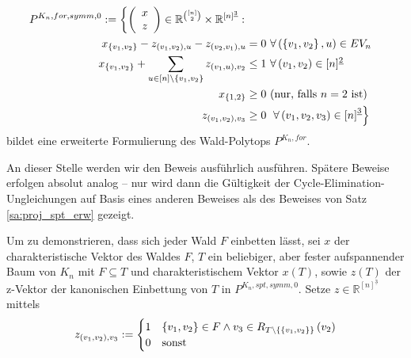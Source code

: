 \documentclass[10p,a4paper,BCOR = 12mm, DIV=15]{scrbook}
\begin{document}
{\begin{Sa}
\label{sa:baum_erweitert_1}
\begin{align}
P^{K_n, for, symm, 0} := \left\{\left(\begin{array}{c}
x \\
z
\end{array}\right)\in\mathbb{R}^{[n]\choose 2}\times \mathbb{R}^{[n]^{\underline{3}}}: \right. \nonumber \\
x_{\left\{v_1, v_2\right\}} - z_{\left(v_1, v_2\right), u} - z_{\left(v_2, v_1\right), u} & = 0\ \forall \left(\left\{v_1, v_2\right\}, u\right)\in EV_n \label{eq:fst_erweitert_2_1} \\
x_{\left\{v_1, v_2\right\}} + \sum_{u\in[n]\backslash\left\{v_1, v_2\right\}} z_{\left(v_1, u\right), v_2} & \leq 1\ \forall \left(v_1, v_2\right)\in [n]^{\underline{2}} \label{eq:fst_erweitert_2_2} \\
x_{\left\{1, 2\right\}} & \geq 0 \textnormal{ (nur, falls $n=2$ ist)} \label{eq:wald_xgeq0} \\
z_{\left(v_1, v_2\right), v_3} & \geq 0 \nonumber \left. \ \forall \left(v_1, v_2, v_3\right) \in \left[n\right]^{\underline{3}}\right\}
\end{align}
bildet eine erweiterte Formulierung des Wald-Polytops $P^{K_n, for}$.
\end{Sa}

\begin{bew}
An dieser Stelle werden wir den Beweis ausführlich ausführen. Spätere Beweise erfolgen absolut analog -- nur wird dann die Gültigkeit der Cycle-Elimination-Ungleichungen auf Basis eines anderen Beweises als des Beweises von Satz \ref{sa:proj_spt_erw} gezeigt.

Um zu demonstrieren, dass sich jeder Wald $F$ einbetten lässt, sei $x$ der charakteristische Vektor des Waldes $F$, $T$ ein beliebiger, aber fester aufspannender Baum von $K_n$ mit $F \subseteq T$ und charakteristischem Vektor $x\left(T\right)$, sowie $z\left(T\right)$ der z-Vektor der kanonischen Einbettung von $T$ in $P^{K_n, spt, symm, 0}$. Setze $z\in \mathbb{R}^{[n]^{\underline{3}}}$ mittels
\begin{displaymath}
z_{\left(v_1, v_2\right), v_3} := \begin{cases}
1 & \left\{v_1, v_2\right\}\in F\wedge v_3 \in R_{T\backslash \left\{\left\{v_1, v_2\right\}\right\}}\left(v_2\right) \\
0 & \textnormal{sonst}
\end{cases}
\end{displaymath}


\end{bew}}
\end{document}
